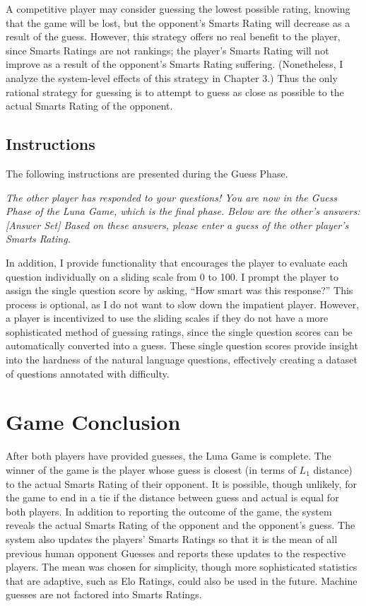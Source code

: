 A competitive player may consider guessing the lowest possible rating, knowing that the game will be lost, but the opponent's Smarts Rating will decrease as a result of the guess. However, this strategy offers no real benefit to the player, since Smarts Ratings are not rankings; the player's Smarts Rating will not improve as a result of the opponent's Smarts Rating suffering. (Nonetheless, I analyze the system-level effects of this strategy in Chapter 3.) Thus the only rational strategy for guessing is to attempt to guess as close as possible to the actual Smarts Rating of the opponent.

\subsection{Instructions}

The following instructions are presented during the Guess Phase.
\begin{center}
\textit{The other player has responded to your questions! You are now in the Guess Phase of the Luna Game, which is the final phase. Below are the other's answers: [Answer Set] Based on these answers, please enter a guess of the other player's Smarts Rating.}
\end{center}
In addition, I provide functionality that encourages the player to evaluate each question individually on a sliding scale from 0 to 100. I prompt the player to assign the single question score by asking, ``How smart was this response?'' This process is optional, as I do not want to slow down the impatient player. However, a player is incentivized to use the sliding scales if they do not have a more sophisticated method of guessing ratings, since the single question scores can be automatically converted into a guess. These single question scores provide insight into the hardness of the natural language questions, effectively creating a dataset of questions annotated with difficulty.

\section{Game Conclusion}

After both players have provided guesses, the Luna Game is complete. The winner of the game is the player whose guess is closest (in terms of $L_1$ distance) to the actual Smarts Rating of their opponent. It is possible, though unlikely, for the game to end in a tie if the distance between guess and actual is equal for both players. In addition to reporting the outcome of the game, the system reveals the actual Smarts Rating of the opponent and the opponent's guess. The system also updates the players' Smarts Ratings so that it is the mean of all previous human opponent Guesses and reports these updates to the respective players. The mean was chosen for simplicity, though more sophisticated statistics that are adaptive, such as Elo Ratings, could also be used in the future. Machine guesses are not factored into Smarts Ratings.

